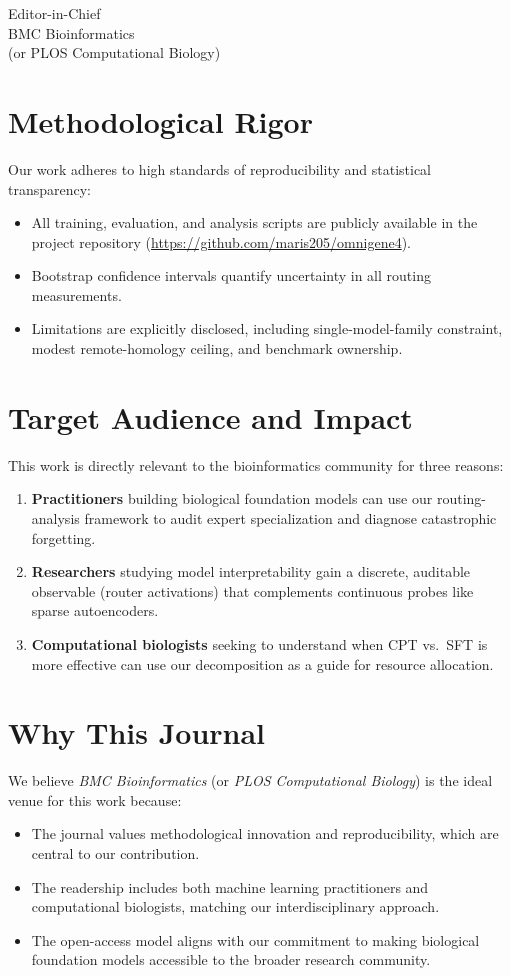 \documentclass[11pt]{letter}
\begin{document}
\begin{letter}{Editor-in-Chief\\
BMC Bioinformatics\\
(or PLOS Computational Biology)}
\section*{Methodological Rigor}

Our work adheres to high standards of reproducibility and statistical transparency:
\begin{itemize}
\item All training, evaluation, and analysis scripts are publicly available in the project repository (\url{https://github.com/maris205/omnigene4}).
\item Bootstrap confidence intervals quantify uncertainty in all routing measurements.
\item Limitations are explicitly disclosed, including single-model-family constraint, modest remote-homology ceiling, and benchmark ownership.
\end{itemize}

\section*{Target Audience and Impact}

This work is directly relevant to the bioinformatics community for three reasons:
\begin{enumerate}
\item \textbf{Practitioners} building biological foundation models can use our routing-analysis framework to audit expert specialization and diagnose catastrophic forgetting.
\item \textbf{Researchers} studying model interpretability gain a discrete, auditable observable (router activations) that complements continuous probes like sparse autoencoders.
\item \textbf{Computational biologists} seeking to understand when CPT vs.\ SFT is more effective can use our decomposition as a guide for resource allocation.
\end{enumerate}

\section*{Why This Journal}

We believe \emph{BMC Bioinformatics} (or \emph{PLOS Computational Biology}) is the ideal venue for this work because:
\begin{itemize}
\item The journal values methodological innovation and reproducibility, which are central to our contribution.
\item The readership includes both machine learning practitioners and computational biologists, matching our interdisciplinary approach.
\item The open-access model aligns with our commitment to making biological foundation models accessible to the broader research community.
\end{itemize}


\end{letter}
\end{document}
